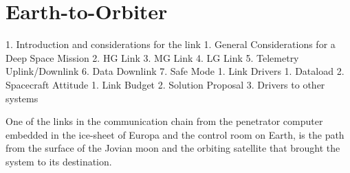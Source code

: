\section{Earth-to-Orbiter} %

1. Introduction and considerations for the link
   1. General Considerations for a Deep Space Mission
   2. HG Link
   3. MG Link
   4. LG Link
   5. Telemetry Uplink/Downlink
   6. Data Downlink
   7. Safe Mode
1. Link Drivers
   1. Dataload
   2. Spacecraft Attitude
1. Link Budget
2. Solution Proposal
3. Drivers to other systems



One of the links in the communication chain from the penetrator computer embedded in the ice-sheet of Europa and the control room on Earth, is the path from the surface of the Jovian moon and the orbiting satellite that brought the system to its destination.


\iffalse
1. Introduction and considerations for the link
      * (Orbit characteristics and Europa Environment)
1. Link Drivers
   1. Radiation (Europa surf dead zone)
   2. Low Power
   3. Transmission Relay Window
      * Dataload
      * Bitrate
   1. Low Temperature Operation
   2. Line of Sight (viewing angles)
      * Communication while descent maneuver
      * Antenna choice
      * Mechanical stabilizers
1. Link Budget
2. Solution Proposal
3. Drivers to other systems
\fi